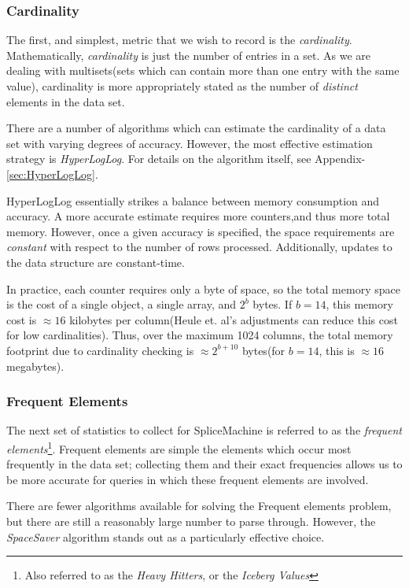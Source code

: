 \subsubsection{Cardinality}
The first, and simplest, metric that we wish to record is the \emph{cardinality}. Mathematically, \emph{cardinality} is just the number of entries in a set. As we are dealing with multisets(sets which can contain more than one entry with the same value), cardinality is more appropriately stated as the number of \emph{distinct} elements in the data set. 

There are a number of algorithms which can estimate the cardinality of a data set with varying degrees of accuracy. However, the most effective estimation strategy is \emph{HyperLogLog}\cite{Flajolet07hyperloglog:the}. For details on the algorithm itself, see Appendix-\ref{sec:HyperLogLog}.

HyperLogLog essentially strikes a balance between memory consumption and accuracy. A more accurate estimate requires more counters,and thus more total memory. However, once a given accuracy is specified, the space requirements are \emph{constant} with respect to the number of rows processed. Additionally, updates to the data structure are constant-time. 

In practice, each counter requires only a byte of space, so the total memory space is the cost of a single object, a single array, and $2^b$ bytes. If $b=14$, this memory cost is $\approx 16$ kilobytes per column(Heule et. al's adjustments can reduce this cost for low cardinalities\cite{HyperLogLogGoogle}). Thus, over the maximum 1024 columns, the total memory footprint due to cardinality checking is $\approx 2^{b+10}$ bytes(for $b=14$, this is $\approx 16$ megabytes).

\subsubsection{Frequent Elements}
The next set of statistics to collect for SpliceMachine is referred to as the \emph{frequent elements}\footnote{Also referred to as the \emph{Heavy Hitters}, or the \emph{Iceberg Values}}. Frequent elements are simple the elements which occur most frequently in the data set; collecting them and their exact frequencies allows us to be more accurate for queries in which these frequent elements are involved.

There are fewer algorithms available for solving the Frequent elements problem, but there are still a reasonably large number to parse through. However, the \emph{SpaceSaver} algorithm stands out as a particularly effective choice.

